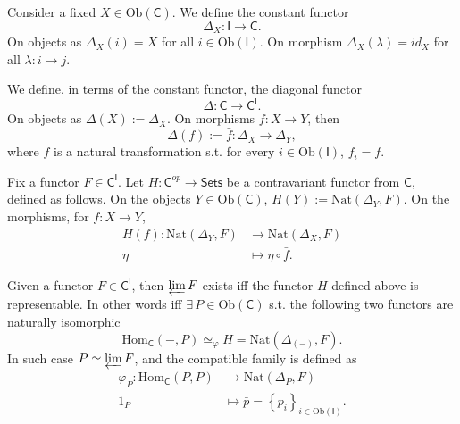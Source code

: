 \begin{defn}
	Consider a fixed $X \in \mathrm{Ob} \left(\mathsf{C}\right)$.
	We define the constant functor
	\begin{equation}
	\Delta_X: \mathsf{I} \to \mathsf{C}
	.\end{equation} 
	On objects as $\Delta_X(i) = X$ for all $i \in \mathrm{Ob} \left(\mathsf{I}\right)$.
	On morphism $\Delta_X(\lambda) = id_X$ for all $\lambda: i \to j$.
\end{defn}

\begin{defn}
	We define, in terms of the constant functor, the diagonal functor
	 \begin{equation}
	\Delta: \mathsf{C} \to \mathsf{C}^{\mathsf{I}}
	.\end{equation} 
	On objects as $\Delta(X) := \Delta_X$.
	On morphisms $f: X \to Y$, then
	\begin{equation}
		\Delta(f) := \bar{f}: \Delta_X \to \Delta_Y
	,\end{equation} 
	where $\bar{f}$ is a natural transformation s.t. for every $i \in \mathrm{Ob} \left(\mathsf{I}\right)$, $\bar{f}_i = f$.
\end{defn}

\begin{defn}
	Fix a functor $F \in \mathsf{C}^{\mathsf{I}}$.
	Let $H: \mathsf{C}^{op} \to \mathsf{Sets}$ be a contravariant functor from $\mathsf{C}$, defined as follows.
	On the objects $Y \in \mathrm{Ob} \left(\mathsf{C}\right)$, 
	$H(Y) := \mathrm{Nat} \left( \Delta_Y, F \right)$.
	On the morphisms, for $f: X \to Y$, 
	 \begin{align}
		 H(f): \mathrm{Nat} \left( \Delta_Y, F \right) &\to \mathrm{Nat} \left( \Delta_X, F \right) \\
		 \eta &\mapsto \eta \circ \bar{f}
	.\end{align} 
\end{defn}

\begin{prop}
	Given a functor $F \in \mathsf{C}^{\mathsf{I}}$, then
	$\varprojlim F$ exists iff the functor $H$ defined above is representable.
	In other words iff $\exists\, P \in \mathrm{Ob} \left(\mathsf{C}\right)$ s.t.
	the following two functors are naturally isomorphic
	\begin{equation}
	\mathrm{Hom}_{\mathsf{C}} \left( -, P \right) \simeq_{\varphi} H =
	\mathrm{Nat} \left( \Delta_{(-)}, F \right)
	.\end{equation} 
	In such case $P \simeq \varprojlim F$, and the compatible family is defined as
	\begin{align}
		\varphi_P: \mathrm{Hom}_{\mathsf{C}} \left( P, P \right) &\to
		\mathrm{Nat} \left( \Delta_P, F \right) \\
		1_P &\mapsto \bar{p} = \left\{ p_i \right\}_{i \in \mathrm{Ob} \left(\mathsf{I}\right)}
	.\end{align} 
\end{prop} 

